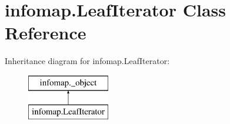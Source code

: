 \hypertarget{classinfomap_1_1LeafIterator}{}\section{infomap.\+Leaf\+Iterator Class Reference}
\label{classinfomap_1_1LeafIterator}
Inheritance diagram for infomap.\+Leaf\+Iterator\+:\begin{figure}[H]
\begin{center}
\leavevmode
\includegraphics[height=2.000000cm]{classinfomap_1_1LeafIterator}
\end{center}
\end{figure}
